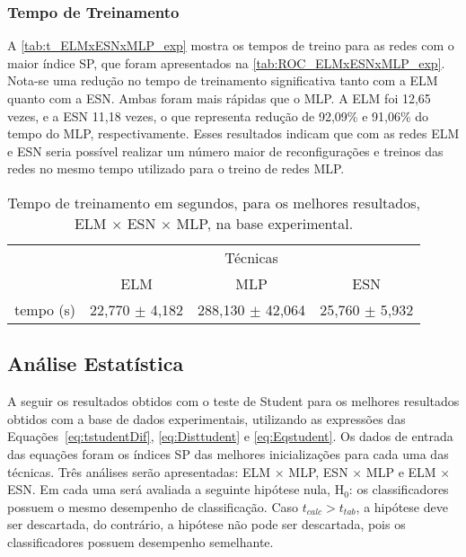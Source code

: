 \subsubsection{Tempo de Treinamento}

A \autoref{tab:t_ELMxESNxMLP_exp} mostra os tempos de treino para as redes com o maior índice SP, que foram apresentados na \autoref{tab:ROC_ELMxESNxMLP_exp}. Nota-se uma redução no tempo de treinamento significativa tanto com a ELM quanto com a ESN. Ambas foram mais rápidas que o MLP. A ELM foi 12,65 vezes, e a ESN 11,18 vezes, o que representa redução de 92,09\% e 91,06\% do tempo do MLP, respectivamente. Esses resultados indicam que com as redes ELM e ESN seria possível realizar um número maior de reconfigurações e treinos das redes no mesmo tempo utilizado para o treino de redes MLP.
\begin{table}[H]
	\centering
	\caption{Tempo de treinamento em segundos, para os melhores resultados, ELM $\times$  ESN $\times$ MLP, na base experimental.}
	\label{tab:t_ELMxESNxMLP_exp}
	\begin{small}
		\setlength{\extrarowheight}{3pt}       %
		\begin{tabular}{c*{3}c} \toprule
			    & \multicolumn{3}{c}{Técnicas} \\ \cmidrule(lr){2-4}
			 	&	     {ELM}		  &	       {MLP}         &     {ESN}              \\ \cmidrule(lr){2-2}\cmidrule(lr){3-3}\cmidrule(lr){4-4}
	tempo (s)	& 22,770  $\pm$ 4,182 &  288,130 $\pm$ 42,064 &  25,760  $\pm$  5,932  \\ \bottomrule
		\end{tabular}
	\end{small}
\end{table}%

\subsection{Análise Estatística}

A seguir os resultados obtidos com o teste de Student para os melhores resultados obtidos com a base de dados experimentais, utilizando as expressões das Equações~\ref{eq:tstudentDif}, \ref{eq:Disttudent} e \ref{eq:Eqstudent}. Os dados de entrada das equações foram os índices SP das melhores inicializações para cada uma das técnicas. Três análises serão apresentadas: ELM $\times$ MLP, ESN $\times$ MLP e ELM $\times$ ESN. Em cada uma será avaliada a seguinte hipótese nula, H$_0$: os classificadores possuem o mesmo desempenho de classificação. Caso $t_{calc}>t_{tab}$, a hipótese deve ser descartada, do contrário, a hipótese não pode ser descartada, pois os classificadores possuem desempenho semelhante.

